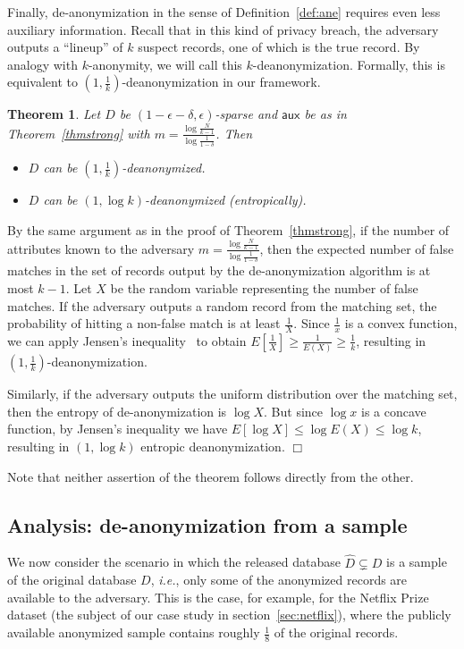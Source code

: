 \documentclass[11pt]{article}
\newcommand{\ie}{\emph{i.e.}}
\newcommand{\aux}{\textsf{aux}}
\newtheorem{theorem}{Theorem}
\newcommand{\qed}{\hfill \ensuremath{\Box}}
\begin{document}
Finally, de-anonymization in the sense of Definition~\ref{def:ane}
requires even less auxiliary information.  Recall that in this kind
of privacy breach, the adversary outputs a ``lineup'' of $k$ suspect
records, one of which is the true record.  By analogy with $k$-anonymity,
we will call this $k$-deanonymization.  Formally, this is equivalent
to $(1,\frac{1}{k})$-deanonymization in our framework.

\begin{theorem}
\label{thmweak}
Let $D$ be $(1-\epsilon-\delta, \epsilon)$-sparse and
$\aux$ be as in Theorem~\ref{thmstrong} with $m = \frac{\log
\frac{N}{k-1}}{\log\frac{1}{1-\delta}}$.  
Then \begin{itemize}
\item$D$ can be $(1, \frac 1 k)$-deanonymized.
\item$D$ can be $(1, \log k)$-deanonymized (entropically).
\end{itemize}
\end{theorem}

By the same argument as in the proof of Theorem~\ref{thmstrong},
if the number of attributes known to the adversary $m = \frac{\log
\frac{N}{k-1}}{\log\frac{1}{1-\delta}}$, then the expected number
of false matches in the set of records output by the de-anonymization
algorithm is at most $k-1$.  Let $X$ be the random variable representing
the number of false matches.  If the adversary outputs a random record
from the matching set, the probability of hitting a non-false match is at
least $\frac 1 X$.  Since $\frac 1 x$ is a convex function, we can apply
Jensen's inequality~\cite{jensen} to obtain $E[\frac 1 X] \geq \frac 1
{E(X)} \geq \frac 1 k$, resulting in $(1, \frac 1 k)$-deanonymization.

Similarly, if the adversary outputs the uniform distribution over
the matching set, then the entropy of de-anonymization is $\log X$.
But since $\log x$ is a concave function, by Jensen's inequality we
have $E[\log X] \leq \log E(X) \leq \log k$, resulting in $(1, \log k)$
entropic deanonymization. \qed

Note that neither assertion of the theorem follows directly from the
other.


\subsection{Analysis: de-anonymization from a sample}

We now consider the scenario in which the released database ${\hat D}
\subsetneq D$ is a sample of the original database $D$, \ie, only some
of the anonymized records are available to the adversary.  This is the
case, for example, for the Netflix Prize dataset (the subject of our
case study in section~\ref{sec:netflix}), where the publicly available
anonymized sample contains roughly $\frac{1}{8}$ of the original records.
\end{document}
